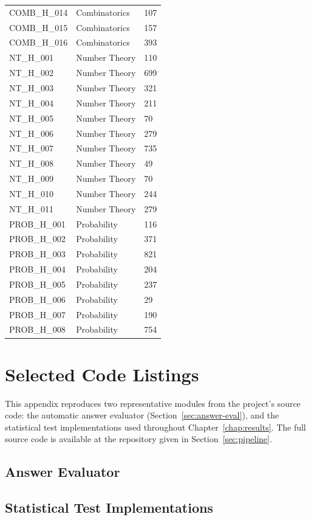 \begin{longtable}{lll}
  COMB\_H\_014 & Combinatorics & 107 \\
  COMB\_H\_015 & Combinatorics & 157 \\
  COMB\_H\_016 & Combinatorics & 393 \\
  NT\_H\_001 & Number Theory & 110 \\
  NT\_H\_002 & Number Theory & 699 \\
  NT\_H\_003 & Number Theory & 321 \\
  NT\_H\_004 & Number Theory & 211 \\
  NT\_H\_005 & Number Theory & 70 \\
  NT\_H\_006 & Number Theory & 279 \\
  NT\_H\_007 & Number Theory & 735 \\
  NT\_H\_008 & Number Theory & 49 \\
  NT\_H\_009 & Number Theory & 70 \\
  NT\_H\_010 & Number Theory & 244 \\
  NT\_H\_011 & Number Theory & 279 \\
  PROB\_H\_001 & Probability & 116 \\
  PROB\_H\_002 & Probability & 371 \\
  PROB\_H\_003 & Probability & 821 \\
  PROB\_H\_004 & Probability & 204 \\
  PROB\_H\_005 & Probability & 237 \\
  PROB\_H\_006 & Probability & 29 \\
  PROB\_H\_007 & Probability & 190 \\
  PROB\_H\_008 & Probability & 754 \\
\end{longtable}

\chapter{Selected Code Listings}
\label{app:code}

This appendix reproduces two representative modules from the project's
source code: the automatic answer evaluator
(Section~\ref{sec:answer-eval}), and the statistical test
implementations used throughout Chapter~\ref{chap:results}. The full
source code is available at the repository given in
Section~\ref{sec:pipeline}.

\section{Answer Evaluator}



\section{Statistical Test Implementations}




